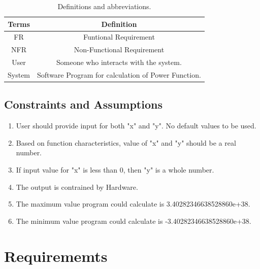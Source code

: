 \documentclass[a4paper,12pt]{article}
\begin{document}
\begin{table}[htp]
	\centering
	\caption{Definitions and abbreviations.} \vspace{0.5cm} \label{tab:definition_table} 
	\begin{tabular}{||c|c||}
		\hline  \hline \textbf{Terms} & \textbf{Definition} \\
		\hline \hline
		FR & Funtional Requirement  \\ 
		\hline
		NFR & Non-Functional Requirement  \\
		\hline
		User & Someone who interacts with the system. \\
		\hline
		System & Software Program for calculation of Power Function. \\
		\hline \hline 
	\end{tabular}
\end{table}



\subsection{Constraints and Assumptions}
\begin{enumerate}
	\item User should provide input for both "x" and "y". No default values to be used.
	\item Based on function characteristics, value of "x" and "y" should be a real number.
	\item If input value for "x" is less than 0, then "y" is a whole number.
	\item The output is contrained by Hardware. 
	\item The maximum value program could calculate is 3.40282346638528860e+38.
	\item The minimum value program could calculate is -3.40282346638528860e+38.
\end{enumerate}








\section{Requirememts}
\end{document}
